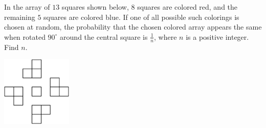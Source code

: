 In the array of $13$ squares shown below, $8$ squares are colored red, and the remaining $5$ squares are colored blue. If one of all possible such colorings is chosen at random, the probability that the chosen colored array appears the same when rotated $90^{\circ}$ around the central square is $\tfrac{1}{n}$, where $n$ is a positive integer. Find $n$.
\begin{center}
\includegraphics[width = 33.6mm]{img/fig0.png}
\end{center}